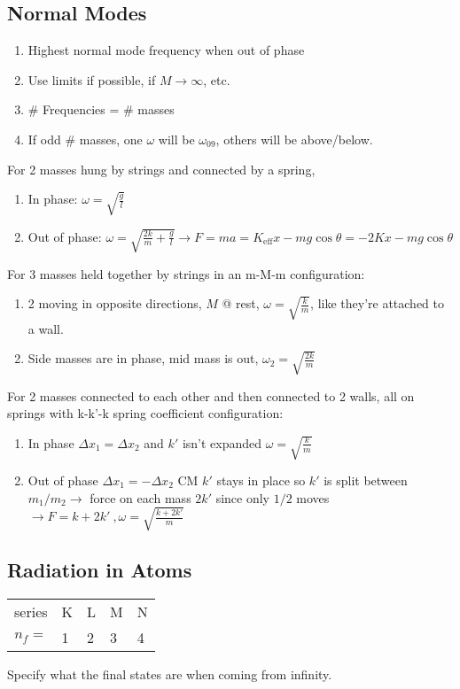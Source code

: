 \documentclass[10pt,letter]{article}
\begin{document}
\subsection{Normal Modes}
\begin{enumerate}
    \item Highest normal mode frequency when out of phase
    \item Use limits if possible, if $M \rightarrow \infty$, etc.
    \item \# Frequencies = \# masses
    \item If odd \# masses, one $\omega$ will be $\omega_09$, others will be above/below.
\end{enumerate}
For 2 masses hung by strings and connected by a spring,
\begin{enumerate}
    \item In phase: $\omega = \sqrt{\frac{g}{l}}$
    \item Out of phase: $\omega = \sqrt{\frac{2k}{m} + \frac{g}{l}} \rightarrow F = ma = K_{\textrm{eff}}x - mg\cos \theta = -2Kx - mg \cos \theta$
\end{enumerate}
For 3 masses held together by strings in an m-M-m configuration:
\begin{enumerate}
    \item 2 moving in opposite directions, $M$ @ rest, $\omega= \sqrt{\frac{k}{m}}$, like they're attached to a wall.
    \item Side masses are in phase, mid mass is out, $\omega_2 = \sqrt{\frac{2k}{m}}$
\end{enumerate}
For 2 masses connected to each other and then connected to 2 walls, all on springs with k-k'-k spring coefficient configuration:
\begin{enumerate}
    \item In phase $\Delta x_1 = \Delta x_2$ and $k'$ isn't expanded $\omega = \sqrt{\frac{k}{m}}$
    \item Out of phase $\Delta x_1 = -\Delta x_2$ CM $k'$ stays in place so $k'$ is split between $m_1/m_2 \rightarrow$ force on each mass $2k'$ since only $1/2$ moves $\rightarrow F = k + 2k'~,\omega = \sqrt{\frac{k + 2k'}{m}}$
\end{enumerate}

\subsection{Radiation in Atoms}
\begin{tabular}{r l l l l}
series & K & L & M & N\\
$n_f=$ & 1 & 2 & 3 & 4
\end{tabular}
Specify what the final states are when coming from infinity. 
\end{document}
